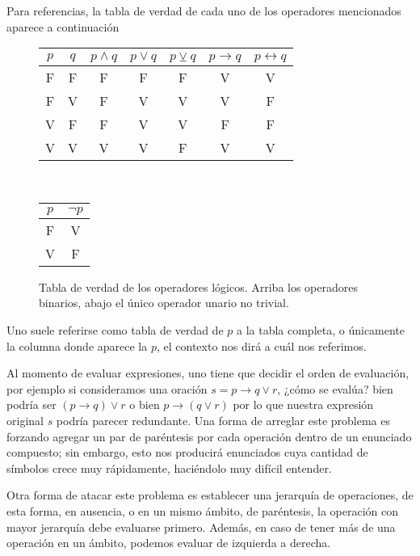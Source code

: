 \documentclass{book}
\theoremstyle{definition}
\begin{document}
Para referencias, la tabla de verdad de cada uno de los operadores mencionados aparece a continuación
\begin{figure}[h]
\begin{center}\begin{tabular}{|c|c||c|c|c|c|c|}
	\hline 
	$p$& $q$ & $p \wedge q $ & $p \vee q$  & $p \veebar q $ & $p \rightarrow q$ & $p \leftrightarrow q$  \\
	\hline \hline
	F & F & F & F & F & V & V \\
	\hline
	F & V & F & V & V & V & F \\
	\hline
	V & F & F & V & V & F & F \\
	\hline
	V & V & V & V & F & V & V \\
	\hline
\end{tabular}\\
\begin{tabular}{|c||c|}
	\hline
	$p$ & $\neg p$ \\
	\hline \hline
	F & V \\
	\hline
	V & F \\
	\hline
\end{tabular}
\end{center}
\caption{Tabla de verdad de los operadores lógicos. Arriba los operadores binarios, abajo el único operador unario no trivial.}
\label{tb_tablaVerdadOperadores}
\end{figure}

Uno suele referirse como tabla de verdad de $p$ a la tabla completa, o únicamente la columna donde aparece la $p$, el contexto nos dirá a cuál nos referimos.

Al momento de evaluar expresiones, uno tiene que decidir el orden de evaluación, por ejemplo si consideramos una oración $s=p\rightarrow q \vee r$, ¿cómo se evalúa? bien podría ser $(p\rightarrow q) \vee r$ o bien $p\rightarrow (q \vee r)$ por lo que nuestra expresión original $s$ podría parecer redundante. Una forma de arreglar este problema es forzando agregar un par de paréntesis por cada operación dentro de un enunciado compuesto; sin embargo, esto nos producirá enunciados cuya cantidad de símbolos crece muy rápidamente, haciéndolo muy difícil entender.

Otra forma de atacar este problema es establecer una jerarquía de operaciones, de esta forma, en ausencia, o en un mismo ámbito, de paréntesis, la operación con mayor jerarquía debe evaluarse primero.
Además, en caso de tener más de una operación en un ámbito, podemos evaluar de izquierda a derecha.
\end{document}
